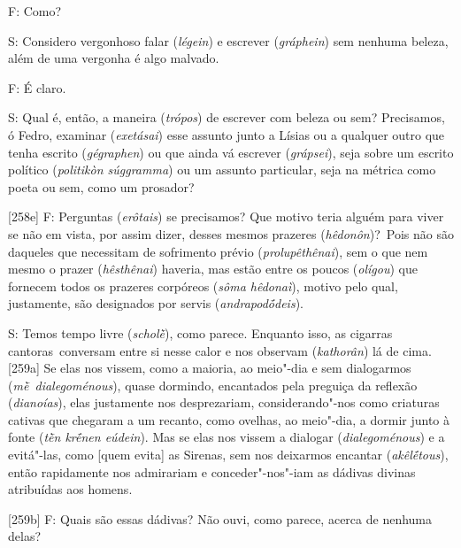  

F: Como?

 

S: Considero vergonhoso falar (\emph{légein}) e escrever
(\emph{gráphein}) sem nenhuma beleza, além de uma vergonha é algo
malvado.

 

F: É claro.

 

S: Qual é, então, a maneira (\emph{trópos}) de escrever com beleza ou sem?
Precisamos, ó Fedro, examinar (\emph{exetásai}) esse assunto junto a
Lísias ou a qualquer outro que tenha escrito (\emph{gégraphen}) ou que
ainda vá escrever (\emph{grápsei}), seja sobre um escrito político
(\emph{politikòn súggramma}) ou um assunto particular, seja na métrica
como poeta ou sem, como um prosador?

 

[258e] F: Perguntas (\emph{erôtais}) se precisamos? Que motivo teria
alguém para viver se não em vista, por assim dizer, desses mesmos
prazeres (\emph{hêdonôn})?~Pois não são daqueles que necessitam de
sofrimento prévio (\emph{prolupêthênai}), sem o que nem mesmo o prazer
(\emph{hêsthênai}) haveria, mas estão entre os poucos (\emph{olígou})
que fornecem todos os prazeres corpóreos (\emph{sôma hêdonaì}), motivo
pelo qual, justamente, são designados por servis (\emph{andrapodṓdeis}).

 

S: Temos tempo livre (\emph{scholḕ}), como parece. Enquanto isso, as
cigarras cantoras~conversam entre si nesse calor e nos observam
(\emph{kathorân}) lá de cima. [259a] Se elas nos vissem, como a
maioria, ao meio"-dia e sem dialogarmos (\emph{mḕ~dialegoménous}), quase
dormindo, encantados pela preguiça da reflexão (\emph{dianoías}), elas
justamente nos desprezariam, considerando"-nos como criaturas cativas que
chegaram a um recanto, como ovelhas, ao meio"-dia, a dormir junto à fonte
(\emph{tḕn krḗnen eúdein}). Mas se elas nos vissem a dialogar
(\emph{dialegoménous}) e a evitá"-las, como [quem evita] as Sirenas,
sem nos deixarmos encantar (\emph{akêlḗtous}), então rapidamente nos
admirariam e conceder"-nos"-iam as dádivas divinas atribuídas aos homens.

 

[259b] F: Quais são essas dádivas? Não ouvi, como parece, acerca de
nenhuma delas?

 

